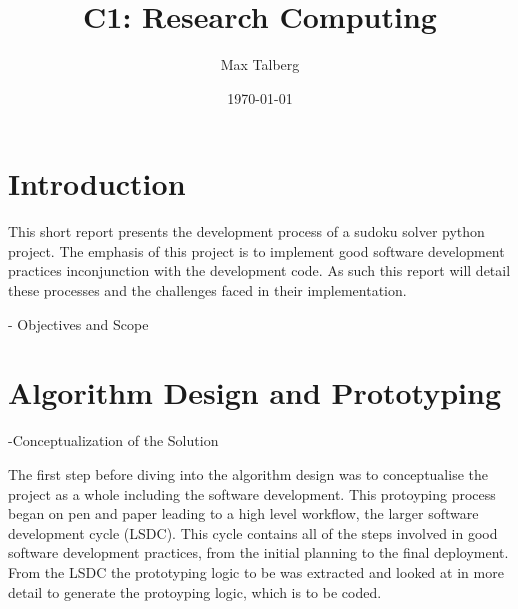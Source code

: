 \documentclass{report}
\title{C1: Research Computing}
\author{Max Talberg}
\date{\today}
\begin{document}
\maketitle
\tableofcontents
\pagebreak

\section{Introduction}
This short report presents the development process of a sudoku solver python project.
The emphasis of this project is to implement good software development practices inconjunction with the development code.
As such this report will detail these processes and the challenges faced in their implementation.


- Objectives and Scope

\section{Algorithm Design and Prototyping}
-Conceptualization of the Solution

The first step before diving into the algorithm design was to conceptualise the project as a whole including the software development.
This protoyping process began on pen and paper leading to a high level workflow, the larger software development cycle (LSDC).
This cycle contains all of the steps involved in good software development practices, from the initial planning to the final deployment.
From the LSDC the prototyping logic to be was extracted and looked at in more detail to generate the protoyping logic, which is to be coded.
\end{document}
